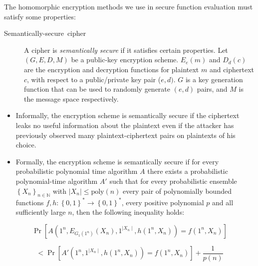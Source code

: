 The homomorphic encryption methods we use in secure function evaluation
must satisfy some properties:
\begin{description}
\item [{Semantically-secure~cipher}] A cipher is \textit{semantically
secure} \cite{Goldwasser:Micali} if it satisfies certain properties.
Let $(G,E,D,M)$ be a public-key encryption scheme. $E_{e}(m)$ and
$D_{d}(c)$ are the encryption and decryption functions for plaintext
$m$ and ciphertext $c$, with respect to a public/private key pair
($e,d)$. $G$ is a key generation function that can be used to randomly
generate $(e,d)$ pairs, and $M$ is the message space respectively. \end{description}
\begin{itemize}
\item Informally, the encryption scheme is semantically secure if the ciphertext
leaks no useful information about the plaintext even if the attacker
has previously observed many plaintext-ciphertext pairs on plaintexts
of his choice. 
\item Formally, the encryption scheme is semantically secure if for every
probabilistic polynomial time algorithm $A$ there exists a probabilistic
polynomial-time algorithm $A'$ such that for every probabilistic
ensemble $\left\{ X_{n}\right\} _{n\in\mathbb{N}}$ with $\mid X_{n}\mid\le\mbox{poly}\left(n\right)$
every pair of polynomially bounded functions $f,h:\left\{ 0,1\right\} ^{*}\rightarrow\left\{ 0,1\right\} ^{*}$,
every positive polynomial $p$ and all sufficiently large $n$, then
the following inequality holds:
\end{itemize}
\[
\Pr\left[A\left(1^{n},E_{G_{1}\left(1^{n}\right)}\left(X_{n}\right),1^{\mid X_{n}\mid},h\left(1^{n},X_{n}\right)\right)=f\left(1^{n},X_{n}\right)\right]\]


\[
<\Pr\left[A'\left(1^{n},1^{\mid X_{n}\mid},h\left(1^{n},X_{n}\right)\right)=f\left(1^{n},X_{n}\right)\right]+\frac{1}{p(n)}\]

